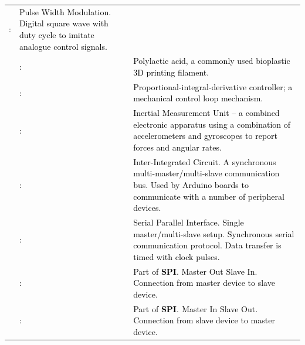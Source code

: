 \documentclass[a4paper]{article}
\begin{document}
\begin{flushleft}
\begin{supertabular}{m{1.52cm}m{0.32200003cm}m{13.557cm}}
{ \textcolor{black}{:}} &
{ \textcolor{black}{Pulse Width Modulation. Digital square wave with duty cycle to imitate
analogue control signals.}}\\
 &
{ \textcolor{black}{:}} &
{ \textcolor{black}{Polylactic acid, a commonly used bioplastic 3D printing filament.}}\\
 &
{ \textcolor{black}{:}} &
{ \textcolor{black}{Proportional-integral-derivative controller; a mechanical control loop
mechanism.}}\\
 &
{ \textcolor{black}{:}} &
{ \textcolor{black}{Inertial Measurement Unit -- a combined electronic apparatus using a
combination of accelerometers and gyroscopes to report forces and angular rates.}}\\
 &
{ \textcolor{black}{:}} &
{ \textcolor{black}{Inter-Integrated Circuit. A synchronous multi-master/multi-slave
communication bus. Used by Arduino boards to communicate with a number of peripheral devices.}}\\
 &
{ \textcolor{black}{:}} &
{ \textcolor{black}{Serial Parallel Interface. Single master/multi-slave setup. Synchronous
serial communication protocol. Data transfer is timed with clock pulses.}}\\
 &
{ \textcolor{black}{:}} &
{ \textcolor{black}{Part of }\textbf{\textcolor{black}{SPI}}\textcolor{black}{. Master Out Slave
In. Connection from master device to slave device.}}\\
 &
{ \textcolor{black}{:}} &
{ \textcolor{black}{Part of
}\textbf{\textcolor{black}{SPI}}\textcolor{black}{.}\textbf{\textcolor{black}{ }}\textcolor{black}{Master In Slave Out.
Connection from slave device to master device.}}\\

\end{supertabular}
\end{flushleft}
\end{document}
